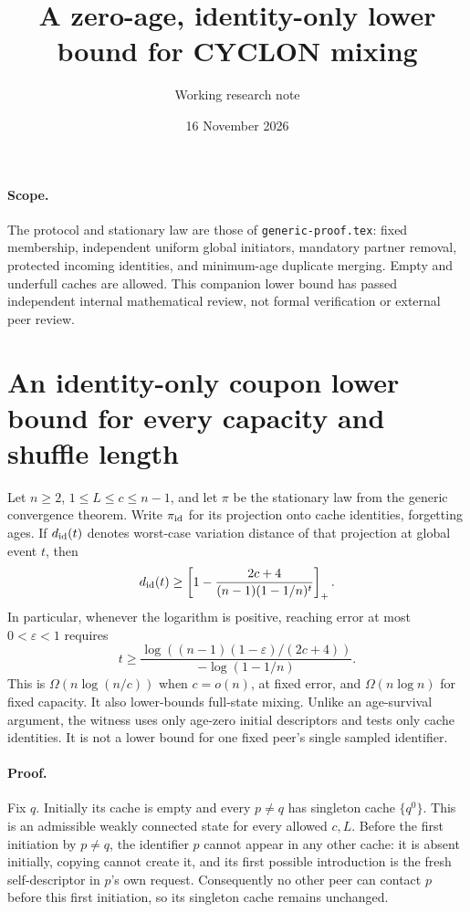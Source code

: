 \documentclass[11pt]{article}
\title{A zero-age, identity-only lower bound for CYCLON mixing}
\author{Working research note}
\date{16 November 2026}
\begin{document}
\maketitle
\paragraph{Scope.} The protocol and stationary law are those of
\texttt{generic-proof.tex}: fixed membership, independent uniform global
initiators, mandatory partner removal, protected incoming identities, and
minimum-age duplicate merging. Empty and underfull caches are allowed.
This companion lower bound has passed independent internal mathematical
review, not formal verification or external peer review.
\section{An identity-only coupon lower bound for every capacity and shuffle length}
Let $n\ge2$, $1\le L\le c\le n-1$, and let $\pi$ be the stationary law
from the generic convergence theorem. Write $\pi_{\rm id}$ for its projection
onto cache identities, forgetting ages. If $d_{\rm id}(t)$ denotes worst-case
variation distance of that projection at global event $t$, then
\[
 d_{\rm id}(t)\ge
 \left[1-\frac{2c+4}{(n-1)(1-1/n)^t}\right]_+.
\]
In particular, whenever the logarithm is positive, reaching error at most
$0<\varepsilon<1$ requires
\[
 t\ge
 \frac{\log\!\left((n-1)(1-\varepsilon)/(2c+4)\right)}
 {-\log(1-1/n)}.
\]
This is $\Omega(n\log(n/c))$ when $c=o(n)$, at fixed error, and
$\Omega(n\log n)$ for fixed capacity. It also lower-bounds full-state
mixing. Unlike an age-survival argument, the witness uses only age-zero
initial descriptors and tests only cache identities. It is not a lower
bound for one fixed peer's single sampled identifier.

\paragraph{Proof.}
Fix $q$. Initially its cache is empty and every $p\ne q$ has singleton cache
$\{q^0\}$. This is an admissible weakly connected state for every allowed
$c,L$. Before the first initiation by $p\ne q$, the identifier $p$ cannot
appear in any other cache: it is absent initially, copying cannot create
it, and its first possible introduction is the fresh self-descriptor in
$p$'s own request. Consequently no other peer can contact $p$ before this
first initiation, so its singleton cache remains unchanged.
\end{document}
